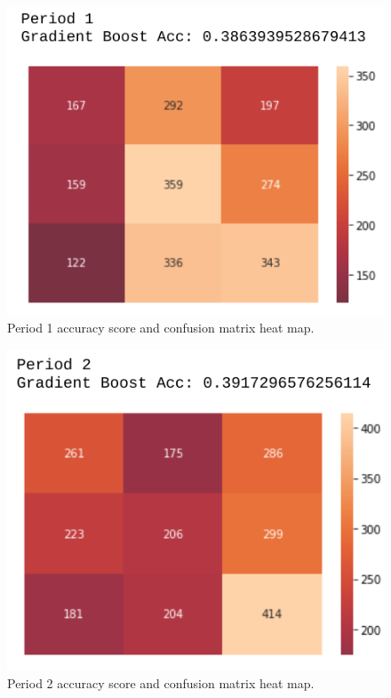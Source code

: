 \documentclass[twocolumn,letterpaper,12pt,notitlepage]{article}
\begin{document}
\begin{figure}[htp]
\centering
\includegraphics[width=\linewidth]{period1cm}
\caption{Period 1 accuracy score and confusion matrix heat map.}
\label{fig:4}
\end{figure}

\begin{figure}[htp]
\centering
\includegraphics[width=\linewidth]{period2cm}
\caption{Period 2 accuracy score and confusion matrix heat map.}
\label{fig:5}
\end{figure}
\end{document}
